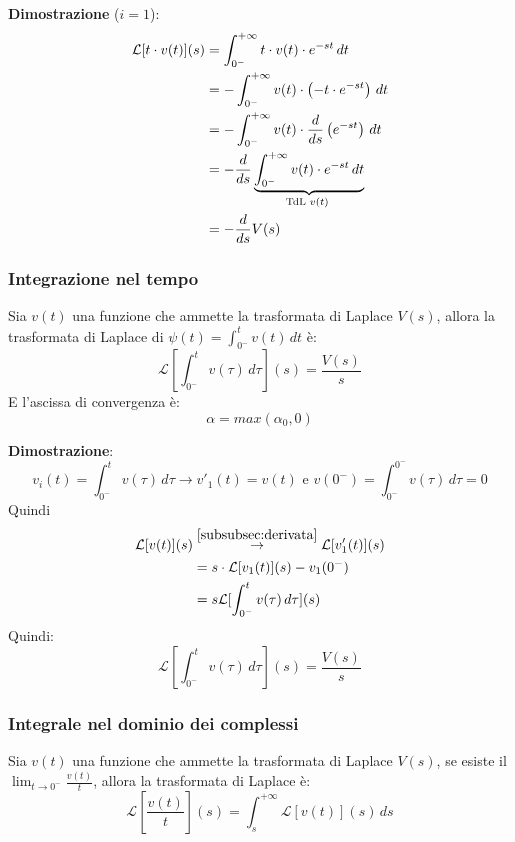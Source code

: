 \documentclass[a4paper]{article}
\begin{document}
\vspace{1em}
\noindent
\textbf{Dimostrazione} (\( i = 1 \)):
\[
  \begin{aligned}
    \mathcal{L}[t \cdot v(t)](s) &= \int_{0^-}^{+\infty} t \cdot v(t) \cdot e^{-st} \, dt\\
                                 &= - \int_{0^-}^{+\infty} v(t) \cdot \left( -t \cdot e^{-st} \right) \, dt\\
                                 &= - \int_{0^-}^{+\infty} v(t) \cdot \frac{d}{ds} \left( e^{-st} \right) \, dt\\
                                 &= - \frac{d}{ds} \underbrace{\int_{0^-}^{+\infty} v(t) \cdot e^{-st} \, dt}_{\text{TdL \( v(t) \) }}\\
                                 &= - \frac{d}{ds} V(s)
  \end{aligned}
\] 

\subsubsection{Integrazione nel tempo}
Sia \( v(t) \) una funzione che ammette la trasformata di Laplace \( V(s) \), allora
la trasformata di Laplace di \( \psi(t) = \int_{0^-}^{t} v(t) \, dt \) è:
\[
  \mathcal{L}\left[\int_{0^-}^{t} v(\tau) \, d\tau\right](s) = \frac{V(s)}{s}
\] 
E l'ascissa di convergenza è:
\[
\alpha = max(\alpha_0,0)
\] 

\vspace{1em}
\noindent
\textbf{Dimostrazione}:
\[
  v_i(t) = \int_{0^-}^{t} v(\tau) \, d\tau \to v'_1(t) = v(t) \text{ e }
  v(0^-) = \int_{0^-}^{0^-} v(\tau) \, d\tau = 0
\] 
Quindi
\[
  \begin{aligned}
    \mathcal{L}[v(t)](s) &\stackrel{ \ref{subsubsec:derivata} }{\to} \mathcal{L}[v'_1(t)](s)\\ 
                         &= s \cdot \mathcal{L}[v_1(t)](s) - v_1(0^-)\\
                         &= s \mathcal{L}[\int_{0^-}^{t} v(\tau) \, d\tau](s)\\
  \end{aligned}
\] 
Quindi:
\[
  \mathcal{L}[\int_{0^-}^{t} v(\tau) \, d\tau](s) = \frac{V(s)}{s}
\] 

\subsubsection{Integrale nel dominio dei complessi}
Sia \( v(t) \) una funzione che ammette la trasformata di Laplace \( V(s) \), se
esiste il \( \lim_{t \to 0^-} \frac{v(t)}{t} \), allora la trasformata di Laplace è:
\[
  \mathcal{L}\left[ \frac{v(t)}{t} \right](s) = \int_{s}^{+\infty} \mathcal{L}[v(t)](s) \, ds
\] 
\end{document}
